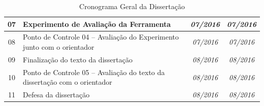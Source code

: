 \documentclass[msc,proposal,hidelot,hideabstract]{ppgccufmg} %
\begin{document}
\begin{table}[]
{\begin{tabular}{@{}clcc@{}}
\multicolumn{1}{|c|}{07}          & \multicolumn{1}{l|}{Experimento de Avaliação da Ferramenta}                                                & \multicolumn{1}{c|}{\textit{07/2016}}          & \multicolumn{1}{c|}{\textit{07/2016}}           \\ \midrule
\multicolumn{1}{|c|}{08}          & \multicolumn{1}{l|}{Ponto de Controle 04 – Avaliação do Experimento junto com o orientador}                & \multicolumn{1}{c|}{\textit{07/2016}}          & \multicolumn{1}{c|}{\textit{07/2016}}           \\ \midrule
\multicolumn{1}{|c|}{09}          & \multicolumn{1}{l|}{Finalização do texto da dissertação}                                                   & \multicolumn{1}{c|}{\textit{08/2016}}          & \multicolumn{1}{c|}{\textit{08/2016}}           \\ \midrule
\multicolumn{1}{|c|}{10}          & \multicolumn{1}{l|}{Ponto de Controle 05 – Avaliação do texto da dissertação com o orientador}             & \multicolumn{1}{c|}{\textit{08/2016}}          & \multicolumn{1}{c|}{\textit{08/2016}}           \\ \midrule
11                                & Defesa da dissertação                                                                                      & \textit{08/2016}                               & \textit{08/2016}                                \\ \bottomrule
\end{tabular}
}
\caption{Cronograma Geral da Dissertação}
\label{tab:cronograma}
\end{table}

\end{document}
